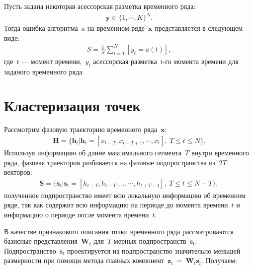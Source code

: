 \documentclass[12pt, twoside]{article}
\numberwithin{equation}{section}
\begin{document}
Пусть задана некоторая асессорская разметка временного ряда:
\begin{equation}
\label{eq:st:6}
\begin{aligned}
\textbf{y} \in \{1,\cdots,K\}^{N}.
\end{aligned}
\end{equation}
Тогда ошибка алгоритма~$a$ на временном ряде~$\textbf{x}$ представляется в следующем виде:
\begin{equation}
\label{eq:st:7}
\begin{aligned}
S = \frac{1}{N}\sum_{t=1}^{N}[y_t = a\left(t\right)],
\end{aligned}
\end{equation}
где~$t$ --- момент времени,~$y_t$ асессорская разметка~$t$-го момента времени для заданого временного ряда.

\section{Кластеризация точек}
Рассмотрим фазовую траекторию временного ряда~$\textbf{x}$:
\begin{equation}
\label{eq:cl:1}
\begin{aligned}
\mathbf{H} = \{\textbf{h}_t| \textbf{h}_t = [x_{t-T}, x_{t-T+1}, \cdots, x_{t}],~T\leq t\leq N\}.
\end{aligned}
\end{equation}
Используя информацию об длине максимального сегмента~$T$ внутри временного ряда, фазовая траектория разбивается на фазовые подпространства из~$2T$ векторов:
\begin{equation}
\label{eq:cl:2}
\begin{aligned}
\mathbf{S} = \{\textbf{s}_t| \textbf{s}_t = [h_{t-T}, h_{t-T+1}, \cdots, h_{t+T-1}],~T\leq t\leq N-T\},
\end{aligned}
\end{equation}
полученное подпространство имеет всю локальную информацию об временном ряде, так как содержит всю информацию на периоде до момента времени~$t$ и информацию о периоде после момента времени~$t$.

В качестве признакового описания точки временного ряда рассматриваются базисные представления~$\textbf{W}_t$ для~$T\text{-мерных}$ подпространств~$\textbf{s}_t$. Подпространство~$\textbf{s}_t$ проектируется на подпространство значительно меньшей размерности при помощи метода главных  компонент~$\textbf{z}_t~=~\textbf{W}_t\textbf{s}_t$. Получаем:
\end{document}

